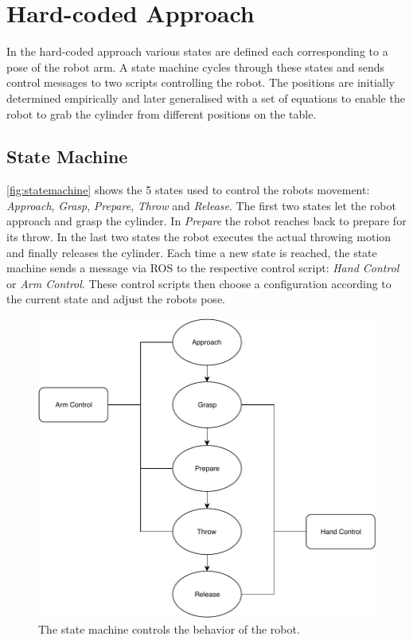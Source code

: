 \section{Hard-coded Approach}
\label{sec:hard-coded}
In the hard-coded approach various states are defined each corresponding to a pose of the robot arm.
A state machine cycles through these states and sends control messages to two scripts controlling the robot.
The positions are initially determined empirically and later generalised with a set of equations to enable the robot to grab the cylinder from different positions on the table.

\subsection{State Machine}
\autoref{fig:statemachine} shows the 5 states used to control the robots movement: \textit{Approach}, \textit{Grasp}, \textit{Prepare}, \textit{Throw} and \textit{Release}.
The first two states let the robot approach and grasp the cylinder.
In \textit{Prepare} the robot reaches back to prepare for its throw.
In the last two states the robot executes the actual throwing motion and finally releases the cylinder.
Each time a new state is reached, the state machine sends a message via ROS to the respective control script: \textit{Hand Control} or \textit{Arm Control}.
These control scripts then choose a configuration according to the current state and adjust the robots pose.

\begin{figure}[tpb]
\centering
	\includegraphics[width=0.9\linewidth]{figures/statemachine.pdf} 
	\caption{The state machine controls the behavior of the robot.}
	\label{fig:statemachine}
\end{figure}

